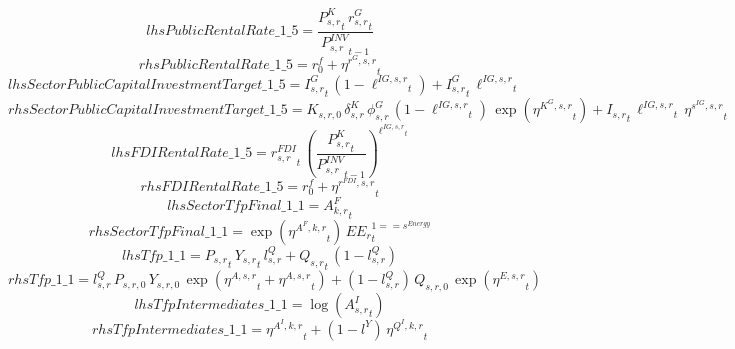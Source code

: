 \begin{dmath*}
lhsPublicRentalRate\_1\_5 = \frac{{{P^K_{s,r}}}_{t}\, {{r^G_{s,r}}}_{t}}{{{P^{INV}_{s,r}}}_{t-1}}
\end{dmath*}
\begin{dmath*}
rhsPublicRentalRate\_1\_5 = {{r^f_0}}+{{\eta^{r^G,s,r}}}_{t}
\end{dmath*}
\begin{dmath*}
lhsSectorPublicCapitalInvestmentTarget\_1\_5 = {{I^G_{s,r}}}_{t}\, \left(1-{{\ell^{IG,s,r}}}_{t}\right)+{{I^G_{s,r}}}_{t}\, {{\ell^{IG,s,r}}}_{t}
\end{dmath*}
\begin{dmath*}
rhsSectorPublicCapitalInvestmentTarget\_1\_5 = {{K_{s,r,0}}}\, {{\delta^{K}_{s,r}}}\, {{\phi^{G}_{s,r}}}\, \left(1-{{\ell^{IG,s,r}}}_{t}\right)\, \exp\left({{\eta^{K^G,s,r}}}_{t}\right)+{{I_{s,r}}}_{t}\, {{\ell^{IG,s,r}}}_{t}\, {{\eta^{s^{IG},s,r}}}_{t}
\end{dmath*}
\begin{dmath*}
lhsFDIRentalRate\_1\_5 = {{r^{FDI}_{s,r}}}_{t}\, \left(\frac{{{P^K_{s,r}}}_{t}}{{{P^{INV}_{s,r}}}_{t-1}}\right)^{{{\ell^{IG,s,r}}}_{t}}
\end{dmath*}
\begin{dmath*}
rhsFDIRentalRate\_1\_5 = {{r^f_0}}+{{\eta^{r^{FDI},s,r}}}_{t}
\end{dmath*}
\begin{dmath*}
lhsSectorTfpFinal\_1\_1 = {{A^{F}_{k,r}}}_{t}
\end{dmath*}
\begin{dmath*}
rhsSectorTfpFinal\_1\_1 = \exp\left({{\eta^{A^F,k,r}}}_{t}\right)\, {{EE_r}}_{t}^{1=={{s^{Energy}}}}
\end{dmath*}
\begin{dmath*}
lhsTfp\_1\_1 = {{P_{s,r}}}_{t}\, {{Y_{s,r}}}_{t}\, {{l^{Q}_{s,r}}}+{{Q_{s,r}}}_{t}\, \left(1-{{l^{Q}_{s,r}}}\right)
\end{dmath*}
\begin{dmath*}
rhsTfp\_1\_1 = {{l^{Q}_{s,r}}}\, {{P_{s,r,0}}}\, {{Y_{s,r,0}}}\, \exp\left({{\eta^{A,s,r}}}_{t}+{{\eta^{A,s,r}}}_{t}\right)+\left(1-{{l^{Q}_{s,r}}}\right)\, {{Q_{s,r,0}}}\, \exp\left({{\eta^{E,s,r}}}_{t}\right)
\end{dmath*}
\begin{dmath*}
lhsTfpIntermediates\_1\_1 = \log\left({{A^{I}_{s,r}}}_{t}\right)
\end{dmath*}
\begin{dmath*}
rhsTfpIntermediates\_1\_1 = {{\eta^{A^{I},k,r}}}_{t}+\left(1-{{l^{Y}}}\right)\, {{\eta^{Q^{I},k,r}}}_{t}
\end{dmath*}
